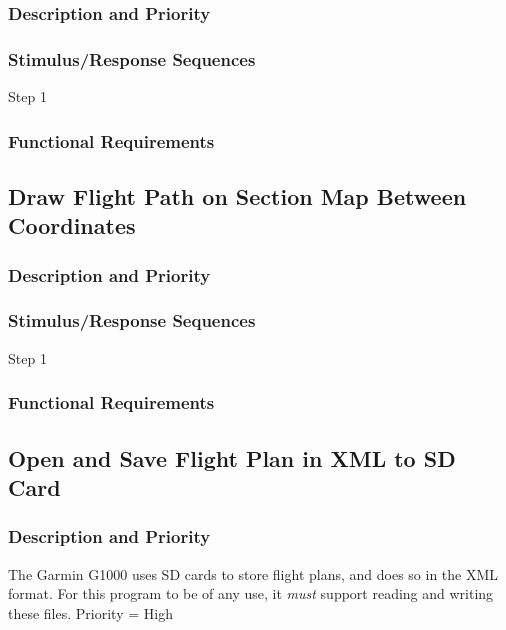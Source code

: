\documentclass[12pt, letterpaper]{article}
\begin{document}
      \subsubsection{Description and Priority}
      \subsubsection{Stimulus/Response Sequences}
        \begin{description}
          \item[Step 1]
        \end{description}
      \subsubsection{Functional Requirements}

      \subsection{Draw Flight Path on Section Map Between Coordinates}
        \subsubsection{Description and Priority}
        \subsubsection{Stimulus/Response Sequences}
          \begin{description}
            \item[Step 1]
          \end{description}
        \subsubsection{Functional Requirements}

        \subsection{Open and Save Flight Plan in XML to SD Card}
          \subsubsection{Description and Priority}
            The Garmin G1000 uses SD cards to store flight plans, and does so in the XML format.
            For this program to be of any use, it \emph{must} support reading and writing these files.
            Priority = High
\end{document}
